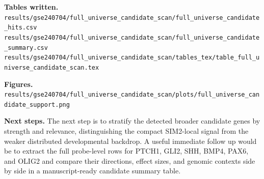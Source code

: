 \textbf{Tables written.}
\texttt{results/gse240704/full\_universe\_candidate\_scan/full\_universe\_candidate\_hits.csv}\\
\texttt{results/gse240704/full\_universe\_candidate\_scan/full\_universe\_candidate\_summary.csv}\\
\texttt{results/gse240704/full\_universe\_candidate\_scan/tables\_tex/table\_full\_universe\_candidate\_scan.tex}

\textbf{Figures.}
\texttt{results/gse240704/full\_universe\_candidate\_scan/plots/full\_universe\_candidate\_support.png}

\textbf{Next steps.}
The next step is to stratify the detected broader candidate genes by strength and relevance, distinguishing the compact SIM2-local signal from the weaker distributed developmental backdrop. A useful immediate follow up would be to extract the full probe-level rows for PTCH1, GLI2, SHH, BMP4, PAX6, and OLIG2 and compare their directions, effect sizes, and genomic contexts side by side in a manuscript-ready candidate summary table.
